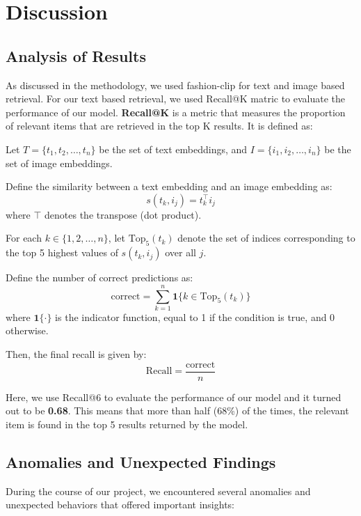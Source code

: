\chapter{Discussion}
\label{chap:discussion}

\section{Analysis of Results}


As discussed in the methodology, we used fashion-clip for text and image based retrieval. For our text based retrieval, we used Recall@K matric to evaluate the performance of our model. \textbf{Recall@K} is a metric that measures the proportion of relevant items that are retrieved in the top K results. It is defined as:

Let \( T = \{ t_1, t_2, \ldots, t_n \} \) be the set of text embeddings, and \( I = \{ i_1, i_2, \ldots, i_n \} \) be the set of image embeddings.

Define the similarity between a text embedding and an image embedding as:
\[
s(t_k, i_j) = t_k^\top i_j
\]
where \( \top \) denotes the transpose (dot product).

For each \( k \in \{1, 2, \ldots, n\} \), let \( \text{Top}_5(t_k) \) denote the set of indices corresponding to the top 5 highest values of \( s(t_k, i_j) \) over all \( j \).

Define the number of correct predictions as:
\[
\text{correct} = \sum_{k=1}^{n} \mathbf{1}\{k \in \text{Top}_5(t_k)\}
\]
where \( \mathbf{1}\{ \cdot \} \) is the indicator function, equal to 1 if the condition is true, and 0 otherwise.

Then, the final recall is given by:
\[
\text{Recall} = \frac{\text{correct}}{n}
\]

Here, we use Recall@6 to evaluate the performance of our model and it turned out to be \textbf{0.68}. This means that more than half (68\%) of the times, the relevant item is found in the top 5 results returned by the model.


\section{Anomalies and Unexpected Findings}

During the course of our project, we encountered several anomalies and unexpected behaviors that offered important insights:

